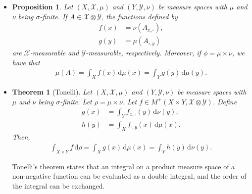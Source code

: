 \documentclass[10pt]{article}
\newtheorem{theorem}[lemma]{Theorem}
\newtheorem{proposition}[lemma]{Proposition}
\numberwithin{lemma}{section}
\newcommand{\dee}{\mathrm{d}}
\newcommand{\mcal}[1]{\mathcal{#1}}
\begin{document}
\begin{itemize}
  \item \begin{proposition}
    Let $(X, \mcal{X}, \mu)$ and $(Y, \mcal{Y}, \nu)$ be measure spaces with $\mu$ and $\nu$ being $\sigma$-finite. If $A \in \mcal{X} \otimes \mcal{Y}$, the functions defined by
    \begin{align*}
      f(x) &= \nu(A_{x,\square}), \\
      g(y) &= \mu(A_{\square,y})
    \end{align*}
    are $\mcal{X}$-measurable and $\mcal{Y}$-measurable, respectively. Moreover, if $\phi = \mu \times \nu$, we have that 
    \begin{align*}
      \mu(A) = \int_X f(x)\, \dee\mu(x) = \int_Y g(y)\, \dee\mu(y).
    \end{align*}
  \end{proposition}

  \item \begin{theorem}[Tonelli] \label{thm:tonelli}
    Let $(X, \mcal{X}, \mu)$ and $(Y, \mcal{Y}, \nu)$ be measure spaces with $\mu$ and $\nu$ being $\sigma$-finite. Let $\rho = \mu \times \nu$. Let $f \in M^+(X \times Y, \mcal{X} \otimes \mcal{Y})$. Define
    \begin{align*}
      g(x) &= \int_{Y} f_{x,\square}(y)\, \dee \nu(y), \\
      h(y) &= \int_{X} f_{\square,y}(x)\, \dee \mu(x).
    \end{align*}
    Then,
    \begin{align*}
      \int_{X \times Y} f\, \dee\rho = \int_X g(x)\, \dee\mu(x) = \int_Y h(y)\, \dee\nu(y).
    \end{align*}
  \end{theorem}
  Tonelli's theorem states that an integral on a product measure space of a non-negative function can be evaluated as a double integral, and the order of the integral can be exchanged.


\end{itemize}
\end{document}

